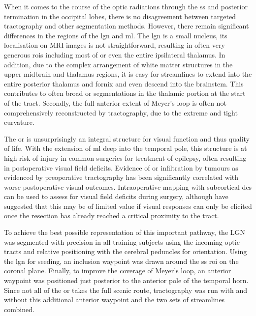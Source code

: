 When it comes to the course of the optic radiations through the \gls{ss} and posterior termination in the occipital lobes, there is no disagreement between targeted tractography and other segmentation methods.
However, there remain significant differences in the regions of the \gls{lgn} and \gls{ml}.
The \gls{lgn} is a small nucleus, its localisation on MRI images is not straightforward, resulting in often very generous \glspl{roi} including most of or even the entire ipsilateral thalamus.
In addition, due to the complex arrangement of white matter structures in the upper midbrain and thalamus regions, it is easy for streamlines to extend into the entire posterior thalamus and fornix and even descend into the brainstem.
This contributes to often broad \gls{or} segmentations in the thalamic portion at the start of the tract.
Secondly, the full anterior extent of Meyer's loop is often not comprehensively reconstructed by tractography, due to the extreme and tight curvature.\autocite{Lilja2015,Chamberland2018}

The \gls{or} is unsurprisingly an integral structure for visual function and thus quality of life.
With the extension of \gls{ml} deep into the temporal pole, this structure is at high risk of injury in common surgeries for treatment of epilepsy, often resulting in postoperative visual field deficits.\autocite{Lacerda2020}
Evidence of \gls{or} infiltration by tumours as evidenced by preoperative tractography has been significantly correlated with worse postoperative visual outcomes.\autocite{Soumpasis2023}
Intraoperative mapping with subcortical \gls{des} can be used to assess for visual field deficits during surgery,\autocite{Duffau2004a,Mazerand2017} although \textcite{Shahar2018} have suggested that this may be of limited value if visual responses can only be elicited once the resection has already reached a critical proximity to the tract.

To achieve the best possible representation of this important pathway, the LGN was segmented with precision in all training subjects using the incoming optic tracts and relative positioning with the cerebral peduncles for orientation.
Using the \gls{lgn} for seeding, an inclusion waypoint was drawn around the \gls{ss} \gls{roi} on the coronal plane.
Finally, to improve the coverage of Meyer's loop, an anterior waypoint was positioned just posterior to the anterior pole of the temporal horn.
Since not all of the \gls{or} takes the full scenic route, tractography was run with and without this additional anterior waypoint and the two sets of streamlines combined.

